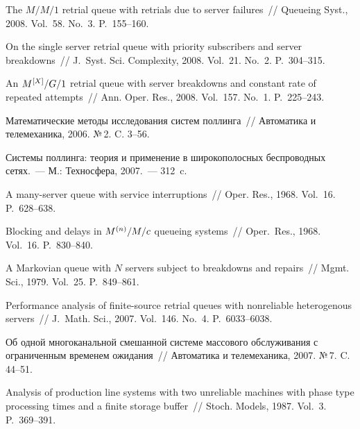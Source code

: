 \begin{multicols}{2}
{{\begin{thebibliography}{99}
The $M/M/1$ retrial queue with retrials due to server failures~//
Queueing Syst., 2008. Vol.~58. No.~3. P.~155--160.

On the single server retrial queue with priority subscribers and server breakdowns~//
J.\ Syst. Sci. Complexity, 2008. Vol.~21. No.~2. P.~304--315.

An $M\hphantom{}^{[X]}/G/1$ retrial queue with server breakdowns and constant rate of repeated attempts~//
Ann. Oper. Res., 2008. Vol.~157. No.~1. P.~225--243.

Математические методы исследования систем поллинга~//
Автоматика и телемеханика, 2006. №\,2. C. 3--56.

Системы поллинга: теория и применение в широкополосных беспроводных сетях.~---
М.: Техносфера, 2007.~--- 312~c.

A many-server queue with service interruptions~//
Oper. Res., 1968. Vol.~16.\linebreak
 P.~628--638.

Blocking and delays in $M\hphantom{}^{(n)}/M/c$ queueing systems~//
Oper.\ Res., 1968. Vol.~16. P.~830--840.

A Markovian queue with $N$ servers subject to breakdowns and repairs~//
Mgmt. Sci., 1979. Vol.~25. P.~849--861.

Performance analysis of finite-source retrial queues with nonreliable heterogenous servers~//
J.~Math. Sci., 2007. Vol.~146. No.~4. P.~6033--6038.

Об одной многоканальной смешанной
системе массового обслуживания с ограниченным временем ожидания~//
Автоматика и телемеханика, 2007. №\,7. C. 44--51.

Analysis of production line systems with two unreliable machines with
phase type processing times and a finite storage buffer~// Stoch. Models, 1987. Vol.~3. P.~369--391.



\end{thebibliography}}}
\end{multicols}
